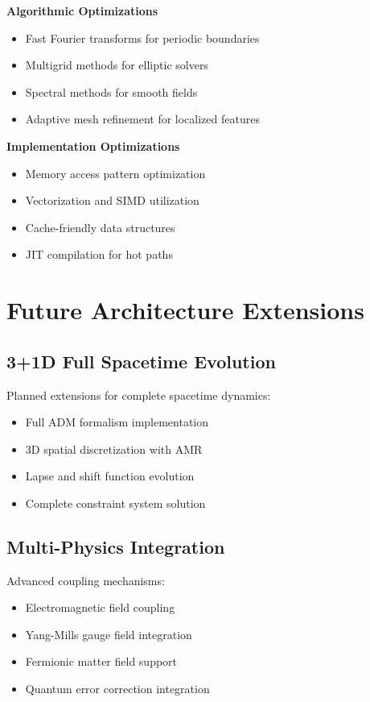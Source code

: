 \documentclass[11pt]{article}
\begin{document}
\textbf{Algorithmic Optimizations}
\begin{itemize}
\item Fast Fourier transforms for periodic boundaries
\item Multigrid methods for elliptic solvers
\item Spectral methods for smooth fields
\item Adaptive mesh refinement for localized features
\end{itemize}

\textbf{Implementation Optimizations}
\begin{itemize}
\item Memory access pattern optimization
\item Vectorization and SIMD utilization
\item Cache-friendly data structures
\item JIT compilation for hot paths
\end{itemize}

\section{Future Architecture Extensions}

\subsection{3+1D Full Spacetime Evolution}

Planned extensions for complete spacetime dynamics:
\begin{itemize}
\item Full ADM formalism implementation
\item 3D spatial discretization with AMR
\item Lapse and shift function evolution
\item Complete constraint system solution
\end{itemize}

\subsection{Multi-Physics Integration}

Advanced coupling mechanisms:
\begin{itemize}
\item Electromagnetic field coupling
\item Yang-Mills gauge field integration
\item Fermionic matter field support
\item Quantum error correction integration
\end{itemize}
\end{document}
